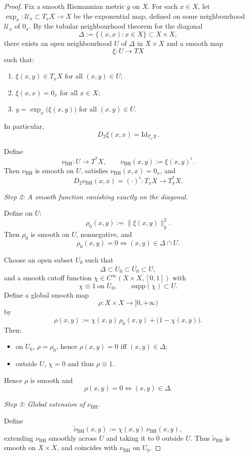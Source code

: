 \documentclass{amsart}
\newcounter{ex}
\newcounter{re}
\begin{document}
{\begin{proof}
Fix a smooth Riemannian metric $g$ on $X$.  
For each $x\in X$, let $\exp_x : \mathcal U_x \subset T_xX \to X$ be the 
exponential map, defined on some neighbourhood $\mathcal U_x$ of $0_x$.
By the tubular neighbourhood theorem for the diagonal
\[
\Delta := \{(x,x) : x\in X\} \subset X\times X,
\]
there exists an open neighbourhood $U$ of $\Delta$ in $X\times X$ and
a smooth map
\[
\xi : U \longrightarrow TX
\]
such that:
\begin{enumerate}
  \item $\xi(x,y)\in T_xX$ for all $(x,y)\in U$;
  \item $\xi(x,x) = 0_x$ for all $x\in X$;
  \item $y = \exp_x\bigl(\xi(x,y)\bigr)$ for all $(x,y)\in U$.
\end{enumerate}
In particular,
\[
D_2\xi(x,x) = \mathrm{Id}_{T_xX}.
\]

Define
\[
\nu_{\mathrm{BH}} : U \longrightarrow T^\ast X,
\qquad
\nu_{\mathrm{BH}}(x,y) := \xi(x,y)^\flat.
\]
Then $\nu_{\mathrm{BH}}$ is smooth on $U$, satisfies
$\nu_{\mathrm{BH}}(x,x)=0_x$, and
\[
D_2\nu_{\mathrm{BH}}(x,x)
= (\cdot)^\flat : T_xX \to T_x^\ast X.
\]

\medskip
\noindent
\emph{Step 2: A smooth function vanishing exactly on the diagonal.}

Define on $U$:
\[
\rho_0(x,y) := \|\xi(x,y)\|_g^2.
\]
Then $\rho_0$ is smooth on $U$, nonnegative, and
\[
\rho_0(x,y) = 0 \Longleftrightarrow (x,y)\in \Delta \cap U.
\]

Choose an open subset $U_0$ such that
\[
\Delta \subset U_0 \subset \overline{U_0} \subset U,
\]
and a smooth cutoff function 
$\chi\in C^\infty(X\times X,[0,1])$ with
\[
\chi \equiv 1 \ \text{on } U_0,
\qquad
\mathrm{supp}(\chi)\subset U.
\]
Define a global smooth map
\[
\rho : X\times X \longrightarrow [0,+\infty)
\]
by
\[
\rho(x,y)
:= \chi(x,y)\,\rho_0(x,y) + \bigl(1-\chi(x,y)\bigr).
\]
Then:
\begin{itemize}
  \item on $U_0$, $\rho=\rho_0$, hence $\rho(x,y)=0$ iff $(x,y)\in\Delta$;
  \item outside $U$, $\chi=0$ and thus $\rho\equiv 1$.
\end{itemize}
Hence $\rho$ is smooth and
\[
\rho(x,y)=0 \Longleftrightarrow (x,y)\in\Delta.
\]

\medskip
\noindent
\emph{Step 3: Global extension of $\nu_{\mathrm{BH}}$.}

Define
\[
\widetilde{\nu}_{\mathrm{BH}}(x,y)
:= \chi(x,y)\,\nu_{\mathrm{BH}}(x,y),
\]
extending $\nu_{\mathrm{BH}}$ smoothly across $U$ and taking it to $0$ outside $U$.
Thus $\widetilde{\nu}_{\mathrm{BH}}$ is smooth on $X\times X$, and coincides
with $\nu_{\mathrm{BH}}$ on $U_0$.


\end{proof}}
\end{document}
